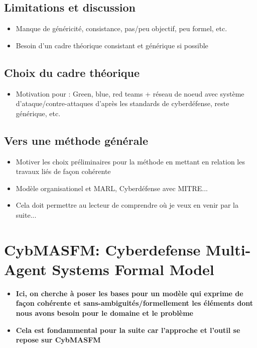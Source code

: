 \documentclass[runningheads]{llncs}
\begin{document}
\subsection{Limitations et discussion}
\begin{itemize}

    \item Manque de généricité, consistance, pas/peu objectif, peu formel, etc.
    \item Besoin d’un cadre théorique consistant et générique si possible
\end{itemize}
\subsection{Choix du cadre théorique}
\begin{itemize}
    \item Motivation pour : Green, blue, red teams + réseau de noeud avec système d’ataque/contre-attaques d’après les standards de cyberdéfense, reste générique, etc.
\end{itemize}
\subsection{Vers une méthode générale}
\begin{itemize}

    \item Motiver les choix préliminaires pour la méthode en mettant en relation les travaux liés de façon cohérente
    \item Modèle organisationel et MARL, Cyberdéfense avec MITRE...
    \item Cela doit permettre au lecteur de comprendre où je veux en venir par la suite...
\end{itemize}


\section{CybMASFM: Cyberdefense Multi-Agent Systems Formal Model}
\begin{itemize}

    \item \textbf{Ici, on cherche à poser les bases pour un modèle qui exprime de façon cohérente et sans-ambiguités/formellement les éléments dont nous avons besoin pour le domaine et le problème}
    \item \textbf{Cela est fondammental pour la suite car l'approche et l'outil se repose sur CybMASFM}
\end{itemize}
\end{document}
